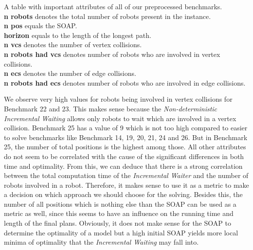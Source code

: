 \documentclass{llncs}
\begin{document}
\begin{table}[]
    \centering
    \vspace{1cm}
    \caption{A table with important attributes of all of our preprocessed benchmarks.\\
    \textbf{n robots} denotes the total number of robots present in the instance.\\
    \textbf{n pos} equals the SOAP.\\
    \textbf{horizon} equals to the length of the longest path.\\
    \textbf{n vcs} denotes the number of vertex collisions.\\
    \textbf{n robots had vcs} denotes number of robots who are involved in vertex collisions.\\
    \textbf{n ecs} denotes the number of edge collisions.\\
    \textbf{n robots had ecs} denotes number of robots who are involved in edge collisions.\\
    }
    \label{tab:tab1}
\end{table}
\newpage
We observe very high values for robots being involved in vertex collisions for Benchmark 22 and 23. This makes sense because the \emph{Non-deterministic Incremental Waiting} allows only robots to wait which are involved in a vertex collision. Benchmark 25 has a value of 9 which is not too high compared to easier to solve benchmarks like Benchmark 14, 19, 20, 21, 24 and 26. But in Benchmark 25, the number of total positions is the highest among those. All other attributes do not seem to be correlated with the cause of the significant differences in both time and optimality.
From this, we can deduce that there is a strong correlation between the total computation time of the \emph{Incremental Waiter} and the number of robots involved in a robot. Therefore, it makes sense to use it as a metric to make a decision on which approach we should choose for the solving. Besides this, the number of all positions which is nothing else than the SOAP can be used as a metric as well, since this seems to have an influence on the running time and length of the final plans. Obviously, it does not make sense for the SOAP to determine the optimality of a model but a high initial SOAP yields more local minima of optimality that the \emph{Incremental Waiting} may fall into.
\end{document}
